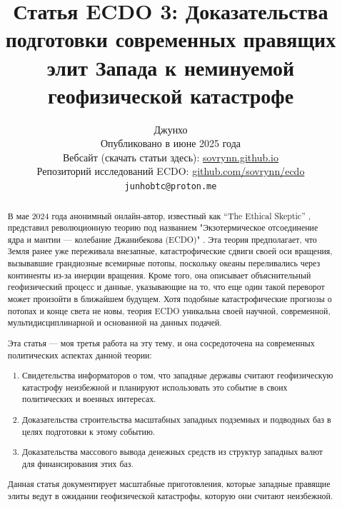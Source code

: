 \documentclass[10pt,twocolumn,letterpaper]{article}
\begin{document}
\title{Статья ECDO 3: Доказательства подготовки современных правящих элит Запада к неминуемой геофизической катастрофе}

\author{Джунхо\\
Опубликовано в июне 2025 года\\
Вебсайт (скачать статьи здесь): \href{https://sovrynn.github.io}{sovrynn.github.io}\\
Репозиторий исследований ECDO: \href{https://github.com/sovrynn/ecdo}{github.com/sovrynn/ecdo}\\
{\tt\small junhobtc@proton.me}
}

\maketitle

\begin{abstract}
В мае 2024 года анонимный онлайн-автор, известный как “The Ethical Skeptic” \cite{0}, представил революционную теорию под названием "Экзотермическое отсоединение ядра и мантии — колебание Джанибекова (ECDO)" \cite{1}. Эта теория предполагает, что Земля ранее уже переживала внезапные, катастрофические сдвиги своей оси вращения, вызывавшие грандиозные всемирные потопы, поскольку океаны переливались через континенты из-за инерции вращения. Кроме того, она описывает объяснительный геофизический процесс и данные, указывающие на то, что еще один такой переворот может произойти в ближайшем будущем. Хотя подобные катастрофические прогнозы о потопах и конце света не новы, теория ECDO уникальна своей научной, современной, мультидисциплинарной и основанной на данных подачей.

Эта статья — моя третья работа \cite{2,3} на эту тему, и она сосредоточена на современных политических аспектах данной теории:
\begin{flushleft}
\begin{enumerate}
    \item Свидетельства информаторов о том, что западные державы считают геофизическую катастрофу неизбежной и планируют использовать это событие в своих политических и военных интересах.
    \item Доказательства строительства масштабных западных подземных и подводных баз в целях подготовки к этому событию.
    \item Доказательства массового вывода денежных средств из структур западных валют для финансирования этих баз.
\end{enumerate}
\end{flushleft}

Данная статья документирует масштабные приготовления, которые западные правящие элиты ведут в ожидании геофизической катастрофы, которую они считают неизбежной.
\end{abstract}
\end{document}
